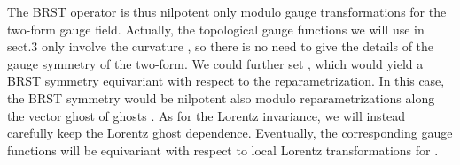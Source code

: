 \documentclass[a4paper,12pt]{article}
\begin{document}
The BRST operator \coordHE{} is thus nilpotent only 
modulo gauge transformations for the two-form gauge field.
Actually, the topological
gauge functions we will use in sect.3
only involve the curvature \coordHE{}, so there
is no need to give the details of the gauge symmetry of the two-form.
We could further set \coordHE{}, which would yield a BRST symmetry equivariant
with respect to the reparametrization. In this case, 
the BRST symmetry would be nilpotent also modulo
reparametrizations along the vector ghost of ghosts \coordHE{}. 
As for the Lorentz invariance, we will instead carefully keep the Lorentz ghost
dependence. Eventually, the corresponding gauge functions 
will be equivariant with respect to local Lorentz transformations 
for \coordHE{}.
\end{document}
